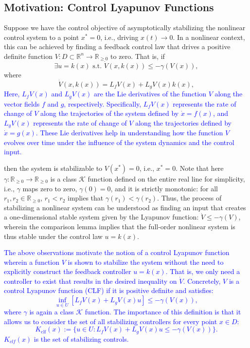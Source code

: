 \documentclass[12pt]{article}
\begin{document}
\subsection{Motivation: Control Lyapunov Functions}
Suppose we have the control objective of asymptotically stabilizing the nonlinear control system to a point \( x^* = 0 \), i.e., driving \( x(t) \to 0 \). In a nonlinear context, this can be achieved by finding a feedback control law that drives a positive definite function \( V : D \subset \mathbb{R}^n \to \mathbb{R}_{\geq 0} \) to zero. That is, if
\[
\exists u = k(x) \text{ s.t. } \dot{V}(x, k(x)) \leq -\gamma(V(x)),
\]
where
\[
\dot{V}(x, k(x)) = L_f V(x) + L_g V(x) k(x),
\]
\textcolor{blue}{Here, \( L_f V(x) \) and \( L_g V(x) \) are the Lie derivatives of the function \( V \) along the vector fields \( f \) and \( g \), respectively. Specifically, \( L_f V(x) \) represents the rate of change of \( V \) along the trajectories of the system defined by \( \dot{x} = f(x) \), and \( L_g V(x) \) represents the rate of change of \( V \) along the trajectories defined by \( \dot{x} = g(x) \). These Lie derivatives help in understanding how the function \( V \) evolves over time under the influence of the system dynamics and the control input.}

then the system is stabilizable to \( V(x^*) = 0 \), i.e., \( x^* = 0 \). Note that here \( \gamma : \mathbb{R}_{\geq 0} \to \mathbb{R}_{\geq 0} \) is a class \( \mathcal{K} \) function defined on the entire real line for simplicity, i.e., \( \gamma \) maps zero to zero, \( \gamma(0) = 0 \), and it is strictly monotonic: for all \( r_1, r_2 \in \mathbb{R}_{\geq 0} \), \( r_1 < r_2 \) implies that \( \gamma(r_1) < \gamma(r_2) \). Thus, the process of stabilizing a nonlinear system can be understood as finding an input that creates a one-dimensional stable system given by the Lyapunov function: \( \dot{V} \leq -\gamma(V) \), wherein the comparison lemma implies that the full-order nonlinear system is thus stable under the control law \( u = k(x) \).

\textcolor{blue}{
The above observations motivate the notion of a control Lyapunov function wherein a function \( V \) is shown to stabilize the system without the need to explicitly construct the feedback controller \( u = k(x) \). That is, we only need a controller to exist that results in the desired inequality on \( \dot{V} \). Concretely, \( V \) is a control Lyapunov function (CLF) if it is positive definite and satisfies:
\[
\inf_{u \in U} [L_f V(x) + L_g V(x) u] \leq -\gamma(V(x)),
\]
where \( \gamma \) is again a class \( \mathcal{K} \) function. The importance of this definition is that it allows us to consider the set of all stabilizing controllers for every point \( x \in D \):
\[
K_{\text{clf}}(x) := \{ u \in U : L_f V(x) + L_g V(x) u \leq -\gamma(V(x)) \}.
\]
}
\textcolor{blue}{
$K_{clf}(x)$ is the set of stabilizing controls. 
}
\end{document}
